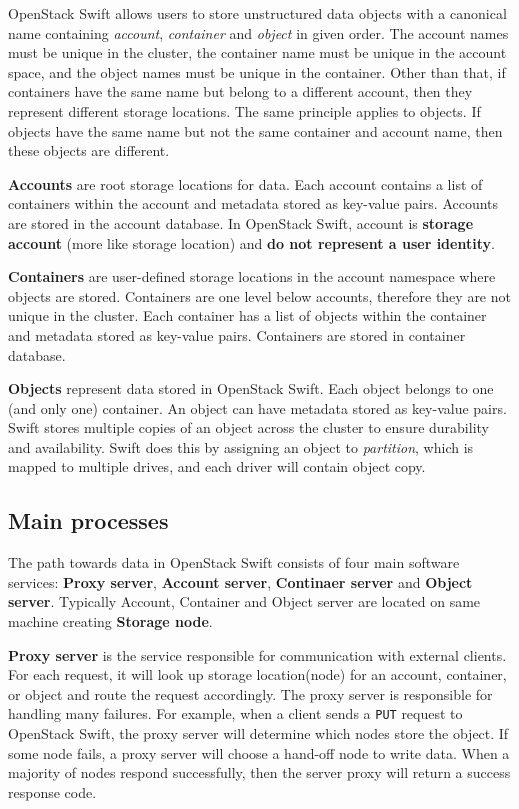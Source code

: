 \documentclass{ExcelAtFIT}
\begin{document}
OpenStack Swift allows users to store unstructured data objects with a canonical name containing \textit{account}, \textit{container} and \textit{object} in given order\cite{swiftOpenStackSwift}. The account names must be unique in the cluster, the container name must be unique in the account space, and the object names must be unique in the container. Other than that, if containers have the same name but belong to a different account, then they represent different storage locations. The same principle applies to objects. If objects have the same name but not the same container and account name, then these objects are different.

\textbf{Accounts} are root storage locations for data. Each account contains a list of containers within the account and metadata stored as key-value pairs. Accounts are stored in the account database. In OpenStack Swift, account is \textbf{storage account} (more like storage location) and \textbf{do not represent a user identity}\cite{swiftOpenStackSwift}.

\textbf{Containers} are user-defined storage locations in the account namespace where objects are stored. Containers are one level below accounts, therefore they are not unique in the cluster. Each container has a list of objects within the container and metadata stored as key-value pairs. Containers are stored in container database\cite{swiftOpenStackSwift}.

\textbf{Objects} represent data stored in OpenStack Swift. Each object belongs to one (and only one) container. An object can have metadata stored as key-value pairs. Swift stores multiple copies of an object across the cluster to ensure durability and availability. Swift does this by assigning an object to \textit{partition}, which is mapped to multiple drives, and each driver will contain object copy\cite{swiftOpenStackSwift}.


\subsection{Main processes}
The path towards data in OpenStack Swift consists of four main software services: \textbf{Proxy server}, \textbf{Account server}, \textbf{Continaer server} and \textbf{Object server}. Typically Account, Container and Object server are located on same machine creating \textbf{Storage node}.

\textbf{Proxy server} is the service responsible for communication with external clients. For each request, it will look up storage location(node) for an account, container, or object and route the request accordingly\cite{SwiftArchitecturalOverview}. The proxy server is responsible for handling many failures. For example, when a client sends a \texttt{PUT} request to OpenStack Swift, the proxy server will determine which nodes store the object. If some node fails, a proxy server will choose a hand-off node to write data. When a majority of nodes respond successfully, then the server proxy will return a success response code\cite{swiftOpenStackSwift}.
\end{document}

